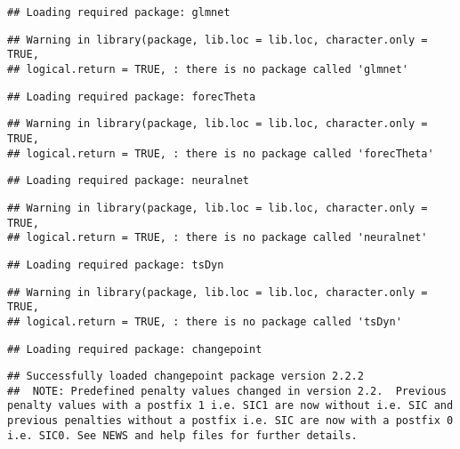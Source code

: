 \documentclass[]{article}
\begin{document}
\begin{verbatim}
## Loading required package: glmnet
\end{verbatim}

\begin{verbatim}
## Warning in library(package, lib.loc = lib.loc, character.only = TRUE,
## logical.return = TRUE, : there is no package called 'glmnet'
\end{verbatim}

\begin{verbatim}
## Loading required package: forecTheta
\end{verbatim}

\begin{verbatim}
## Warning in library(package, lib.loc = lib.loc, character.only = TRUE,
## logical.return = TRUE, : there is no package called 'forecTheta'
\end{verbatim}

\begin{verbatim}
## Loading required package: neuralnet
\end{verbatim}

\begin{verbatim}
## Warning in library(package, lib.loc = lib.loc, character.only = TRUE,
## logical.return = TRUE, : there is no package called 'neuralnet'
\end{verbatim}

\begin{verbatim}
## Loading required package: tsDyn
\end{verbatim}

\begin{verbatim}
## Warning in library(package, lib.loc = lib.loc, character.only = TRUE,
## logical.return = TRUE, : there is no package called 'tsDyn'
\end{verbatim}

\begin{verbatim}
## Loading required package: changepoint
\end{verbatim}

\begin{verbatim}
## Successfully loaded changepoint package version 2.2.2
##  NOTE: Predefined penalty values changed in version 2.2.  Previous penalty values with a postfix 1 i.e. SIC1 are now without i.e. SIC and previous penalties without a postfix i.e. SIC are now with a postfix 0 i.e. SIC0. See NEWS and help files for further details.
\end{verbatim}
\end{document}
